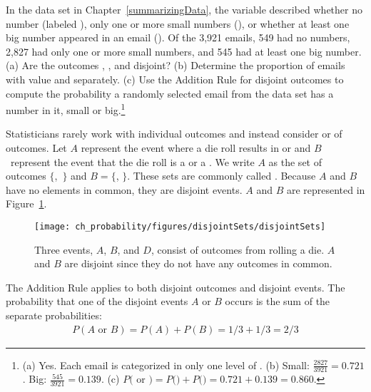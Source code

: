 \begin{exercise}
In the  data set in Chapter~\ref{summarizingData}, the  variable described whether no number (labeled ), only one or more small numbers (), or whether at least one big number appeared in an email (). Of the 3,921 emails, 549 had no numbers, 2,827 had only one or more small numbers, and 545 had at least one big number. (a) Are the outcomes , , and  disjoint? (b) Determine the proportion of emails with value  and  separately. (c) Use the Addition Rule for disjoint outcomes to compute the probability a randomly selected email from the data set has a number in it, small or big.\footnote{(a) Yes. Each email is categorized in only one level of . (b) Small: $\frac{2827}{3921} = 0.721$. Big: $\frac{545}{3921} = 0.139$. (c) $P($ or $) = P($$) + P($$) = 0.721 + 0.139 = 0.860$.}
\end{exercise}


Statisticians rarely work with individual outcomes and instead consider  or  of outcomes. Let $A$ represent the event where a die roll results in  or  and $B$~represent the event that the die roll is a  or a . We write $A$ as the set of outcomes $\{$,~$\}$ and $B=\{$, $\}$. These sets are commonly called . Because $A$ and $B$ have no elements in common, they are disjoint events. $A$ and $B$ are represented in Figure~\ref{disjointSets}.

\begin{figure}[hhh]
\centering
\texttt{[image: ch\_probability/figures/disjointSets/disjointSets]}
\caption{Three events, $A$, $B$, and $D$, consist of outcomes from rolling a die. $A$ and $B$ are disjoint since they do not have any outcomes in common.}
\label{disjointSets}
\end{figure}

The Addition Rule applies to both disjoint outcomes and disjoint events. The probability that one of the disjoint events $A$ or $B$ occurs is the sum of the separate probabilities:
\begin{eqnarray*}
P(A\text{ or }B) = P(A) + P(B) = 1/3 + 1/3 = 2/3
\end{eqnarray*}

